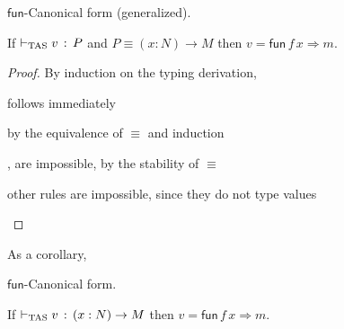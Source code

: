 \begin{lem} $\mathsf{fun}$-Canonical form (generalized).

If $\vdash_{\mathrm{TAS}} v\,:\,P$ and $P\equiv\left(x:N\right)\rightarrow M$ then $v=\mathsf{fun}\,f\,x\Rightarrow m$.
\end{lem}
\begin{proof}
By induction on the typing derivation,
 
\begin{casenv}
\item {} follows immediately
\item {} by the equivalence of $\equiv$ and induction
\item {},  are impossible, by the stability of $\equiv$
\item other rules  are impossible, since they do not type values
\end{casenv}
\end{proof}

As a corollary,

\begin{cor} $\mathsf{fun}$-Canonical form.
 
If $\vdash_{\mathrm{TAS}} v\,:\,\left(x:N\right)\rightarrow M$ then \textup{$v=\mathsf{fun}\,f\,x\Rightarrow m$.}
\end{cor}
 
 
